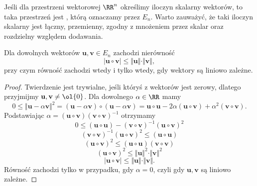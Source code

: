 Jeśli dla przestrzeni wektorowej $\RR^n$ określimy iloczyn skalarny wektorów, to taka przestrzeń jest , którą oznaczamy przez $E_n$. Warto zauważyć, że taki iloczyn skalarny jest łączny, przemienny, zgodny z mnożeniem przez skalar oraz rozdzielny względem dodawania.

\begin{theorem}
    Dla dowolnych wektorów $\mathbf{u}, \mathbf{v} \in E_n$ zachodzi nierówność
    \[ |\mathbf{u} \circ \mathbf{v}| \leq \Vert \mathbf{u} \Vert \cdot \Vert \mathbf{v} \Vert, \]
    przy czym równość zachodzi wtedy i tylko wtedy, gdy wektory są liniowo zależne.
\end{theorem}
\begin{proof}
    Twierdzenie jest trywialne, jeśli któryś z wektorów jest zerowy, dlatego przyjmijmy $\mathbf{u}, \mathbf{v} \neq \ol{0}$. Dla dowolnego $\alpha \in \RR$ mamy
    \[ 0 \leq \Vert\mathbf{u} - \alpha\mathbf{v}\Vert^2 = (\mathbf{u} - \alpha\mathbf{v}) \circ (\mathbf{u} - \alpha\mathbf{v}) = \mathbf{u} \circ \mathbf{u} - 2\alpha(\mathbf{u} \circ \mathbf{v}) + \alpha^2(\mathbf{v} \circ \mathbf{v}). \]
    Podstawiając $\alpha = (\mathbf{u} \circ \mathbf{v})(\mathbf{v} \circ \mathbf{v})^{-1}$ otrzymamy
    \[ 0 \leq (\mathbf{u} \circ \mathbf{u}) - (\mathbf{v} \circ \mathbf{v})^{-1}(\mathbf{u} \circ \mathbf{v})^2 \]
    \[ (\mathbf{v} \circ \mathbf{v})^{-1}(\mathbf{u} \circ \mathbf{v})^2 \leq (\mathbf{u} \circ \mathbf{u}) \]
    \[ (\mathbf{u} \circ \mathbf{v})^2 \leq (\mathbf{u} \circ \mathbf{u})(\mathbf{v} \circ \mathbf{v}) \]
    \[ (\mathbf{u} \circ \mathbf{v})^2 \leq \Vert \mathbf{u} \Vert^2 \cdot \Vert \mathbf{v} \Vert^2 \]
    \[ |\mathbf{u} \circ \mathbf{v}| \leq \Vert \mathbf{u} \Vert \cdot \Vert \mathbf{v} \Vert. \]
    Równość zachodzi tylko w przypadku, gdy $\alpha = 0$, czyli gdy $\mathbf{u}, \mathbf{v}$ są liniowo zależne.
\end{proof}

